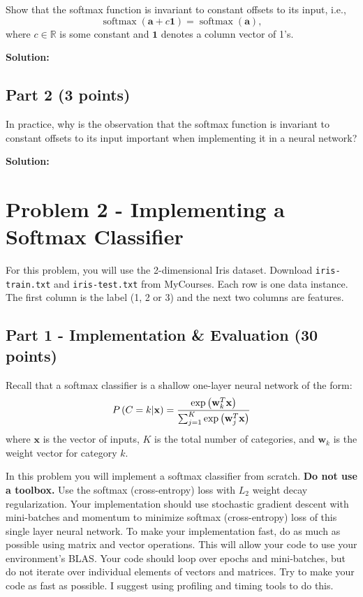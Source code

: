 \documentclass[11pt, oneside]{article}   	%
\begin{document}
Show that the softmax function is invariant to constant offsets to its input, i.e., 
\[
\operatorname{softmax} \left( {{\mathbf{a}} + {c\mathbf{1}}} \right) = \operatorname{softmax} \left( {\mathbf{a}} \right),
\]
where $c\in \mathbb{R}$ is some constant and $\mathbf{1}$ denotes a column vector of 1's.

\textbf{Solution:} \\

\subsection*{Part 2 (3 points)}
In practice, why is the observation that the softmax function is invariant to constant offsets to its input important when implementing it in a neural network?

\textbf{Solution:} \\

\section*{Problem 2 - Implementing a Softmax Classifier}

For this problem, you will use the 2-dimensional Iris dataset. Download \texttt{iris-train.txt} and \texttt{iris-test.txt} from MyCourses. Each row is one data instance. The first column is the label (1, 2 or 3) and the next two columns are features.

\subsection*{Part 1 - Implementation \& Evaluation (30 points)}
Recall that a softmax classifier is a shallow one-layer neural network of the form:
\begin{equation*}
P\left( {C = k|{\bf{x}}} \right) = \frac{{\exp \left( {{\bf{w}}_k^T {\bf{x}}} \right)}}
{{\sum\nolimits_{j = 1}^K {\exp \left( {{\bf{w}}_j^T {\bf{x}}} \right)} }}
\end{equation*}
where $\mathbf{x}$ is the vector of inputs, $K$ is the total number of categories, and $\mathbf{w}_k$ is the weight vector for category $k$.

In this problem you will implement a softmax classifier from scratch. \textbf{Do not use a toolbox.} Use the softmax (cross-entropy) loss with $L_2$ weight decay regularization. Your implementation should use stochastic gradient descent with mini-batches and momentum to minimize softmax (cross-entropy) loss of this single layer neural network. To make your implementation fast, do as much as possible using matrix and vector operations. This will allow your code to use your environment's BLAS. Your code should loop over epochs and mini-batches, but do not iterate over individual elements of vectors and matrices. Try to make your code as fast as possible. I suggest using profiling and timing tools to do this.
\end{document}

